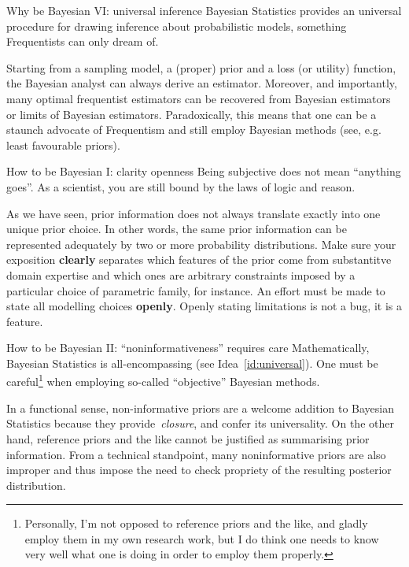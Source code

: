 \begin{frame}{Why be Bayesian VI: universal inference}
Bayesian Statistics provides an universal procedure for drawing inference about probabilistic models, something Frequentists can only dream of.
\begin{idea}
Starting from a sampling model, a (proper) prior and a loss (or utility) function, the Bayesian analyst can always derive an estimator.
Moreover, and importantly, many optimal frequentist estimators can be recovered from Bayesian estimators or limits of Bayesian estimators.
Paradoxically, this means that one can be a staunch advocate of Frequentism and still employ Bayesian methods (see, e.g. least favourable priors). 
 \label{id:universal}
\end{idea}
\end{frame}
\begin{frame}{How to be Bayesian I: clarity openness}
Being subjective does not mean ``anything goes''.
As a scientist, you are still bound by the laws of logic and reason.

\begin{idea}
 As we have seen, prior information does not always translate exactly into one unique prior choice.
 In other words, the same prior information can be represented adequately by two or more probability distributions.
 Make sure your exposition \textbf{clearly} separates which features of the prior come from substantitve domain expertise and which ones are arbitrary constraints imposed by a particular choice of parametric family, for instance.
 An effort must be made to state all modelling choices \textbf{openly}.
 Openly stating limitations is not a bug, it is a feature.
 \end{idea}
\end{frame}
\begin{frame}{How to be Bayesian II: ``noninformativeness'' requires care}
Mathematically, Bayesian Statistics is all-encompassing (see Idea~\ref{id:universal}).
One must be careful\footnote{Personally, I'm not opposed to reference priors and the like, and gladly employ them in my own research work, but I do think one needs to know very well what one is doing in order to employ them properly.} when employing so-called ``objective'' Bayesian methods.
\begin{idea}
 \label{id:careful}
 In a functional sense, non-informative priors are a welcome addition to Bayesian Statistics because they provide~\textit{closure}, and confer its universality.
 On the other hand, reference priors and the like cannot be justified as summarising prior information.
 From a technical standpoint, many noninformative priors are also improper and thus impose the need to check propriety of the resulting posterior distribution.
\end{idea}
 \end{frame}
